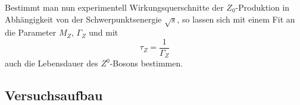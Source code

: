 Bestimmt man nun experimentell Wirkungsquerschnitte der $Z_0$-Produktion in
Abhängigkeit von der Schwerpunktsenergie $\sqrt{s}$, so lassen sich mit einem
Fit an  die Parameter $M_Z$, $Γ_Z$ und mit
\begin{equation}
  τ_Z = \frac{1}{Γ_Z}
\end{equation}
auch die Lebensdauer des $Z^0$-Bosons bestimmen.





\subsection{Versuchsaufbau}